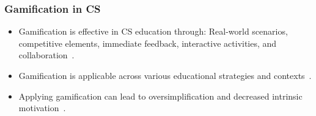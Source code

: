 \documentclass[aspectratio=169]{beamer}
\begin{document}
\begin{frame}%
    \frametitle{Gamification in CS}
    \begin{itemize}
        \item Gamification is effective in CS education through: Real-world scenarios, competitive elements, immediate feedback, interactive activities, and collaboration~\cite{8658524}.
        \item Gamification is applicable across various educational strategies and contexts~\cite{informatics9040075, hirsh2022, Tan_Chong_2023}.%
        \item Applying gamification can lead to oversimplification and decreased intrinsic motivation~\cite{8658524}.
    \end{itemize}
\end{frame}
\end{document}

